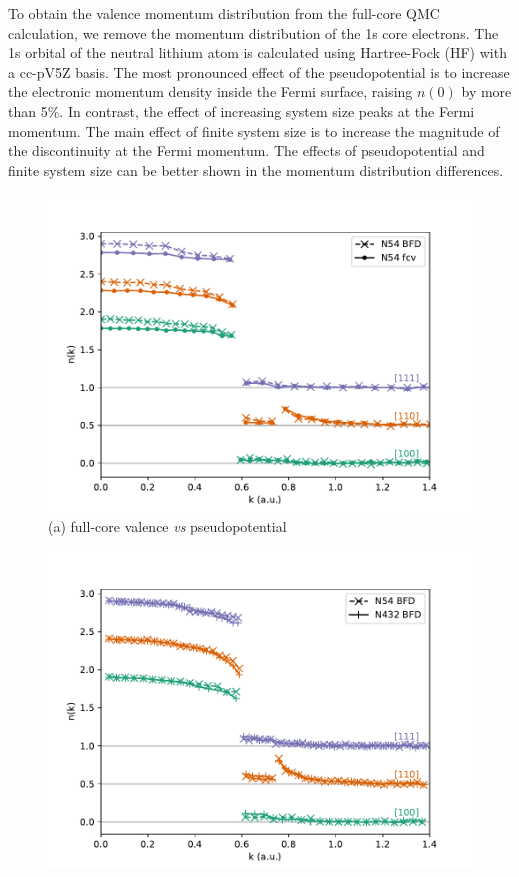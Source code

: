 To obtain the valence momentum distribution from the full-core QMC calculation, we remove the momentum distribution of the 1s core electrons. The 1s orbital of the neutral lithium atom is calculated using Hartree-Fock (HF) with a cc-pV5Z basis. The most pronounced effect of the pseudopotential is to increase the electronic momentum density inside the Fermi surface, raising $n(0)$ by more than 5\%. In contrast, the effect of increasing system size peaks at the Fermi momentum. The main effect of finite system size is to increase the magnitude of the discontinuity at the Fermi momentum. The effects of pseudopotential and finite system size can be better shown in the momentum distribution differences.

\begin{figure}[h]
\begin{minipage}{0.48\columnwidth}
\centering
\includegraphics[width=\linewidth]{li57_dmcfc-fcv-dir}
(a) full-core valence \textit{vs} pseudopotential
\end{minipage}
\begin{minipage}{0.48\columnwidth}
\centering
\includegraphics[width=\linewidth]{li52g_bfd-crystal-n54-n432-nk}

\end{minipage}
\end{figure}
